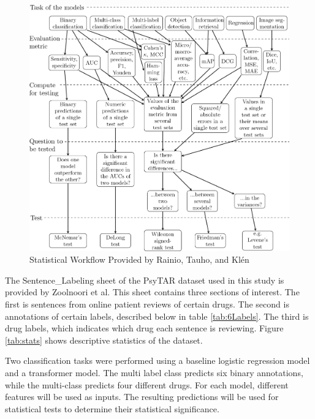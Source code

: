 \documentclass[10.7pt, onecolumn]{article}
\begin{document}
\begin{figure}[H]
  \centering
  \includegraphics[width=\textwidth]{images/41598_2024_56706_Fig3_HTML.png}
  \caption{Statistical Workflow Provided by Rainio, Tauho, and Klén\cite{statsBased}}
  \label{fig:statistical test workflow}
\end{figure}
 
The Sentence\_Labeling sheet of the PsyTAR dataset used in this study is provided by Zoolnoori et al\cite{psyTAR1}\cite{psyTar2}. This sheet contains three sections of interest. The first is sentences from online patient reviews of certain drugs. The second is annotations of certain labels, described below in table \ref{tab:6Labels}. The third is drug labels, which indicates which drug each sentence is reviewing. Figure \ref{tab:stats} shows descriptive statistics of the dataset.

Two classification tasks were performed using a baseline logistic regression model and a transformer model. The multi label class predicts six binary annotations, while the multi-class predicts four different drugs. For each model, different features will be used as inputs. The resulting predictions will be used for statistical tests to determine their statistical significance. 
\end{document}
